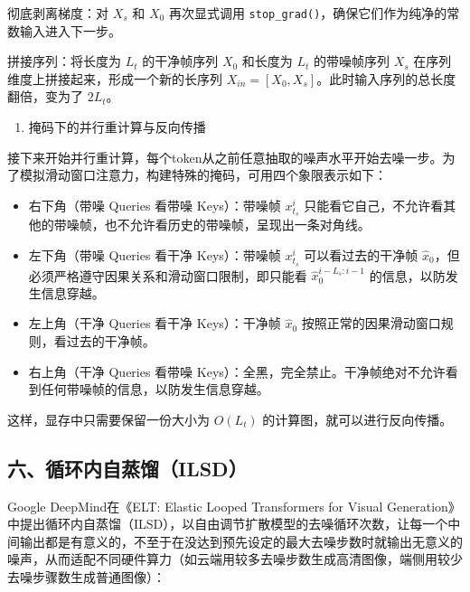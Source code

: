 彻底剥离梯度：对 \(X_s\) 和 \(X_0\) 再次显式调用 \texttt{stop\_grad()}，确保它们作为纯净的常数输入进入下一步。

拼接序列：将长度为 \(L_t\) 的干净帧序列 \(X_0\) 和长度为 \(L_t\) 的带噪帧序列 \(X_s\) 在序列维度上拼接起来，形成一个新的长序列 \(X_{in}=[X_0,X_s]\)。此时输入序列的总长度翻倍，变为了 \(2L_t\)。

\begin{enumerate}
\def\labelenumi{\arabic{enumi}.}
\setcounter{enumi}{2}
\tightlist
\item
  掩码下的并行重计算与反向传播
\end{enumerate}

接下来开始并行重计算，每个token从之前任意抽取的噪声水平开始去噪一步。为了模拟滑动窗口注意力，构建特殊的掩码，可用四个象限表示如下：

\begin{itemize}
\tightlist
\item
  右下角（带噪 Queries 看带噪 Keys）：带噪帧 \(x_{t_s}^i\) 只能看它自己，不允许看其他的带噪帧，也不允许看历史的带噪帧，呈现出一条对角线。
\item
  左下角（带噪 Queries 看干净 Keys）：带噪帧 \(x_{t_s}^i\) 可以看过去的干净帧 \(\hat{x}_0\)，但必须严格遵守因果关系和滑动窗口限制，即只能看 \(\hat{x}_0^{i-L_s:i-1}\) 的信息，以防发生信息穿越。
\item
  左上角（干净 Queries 看干净 Keys）：干净帧 \(\hat{x}_0\) 按照正常的因果滑动窗口规则，看过去的干净帧。
\item
  右上角（干净 Queries 看带噪 Keys）：全黑，完全禁止。干净帧绝对不允许看到任何带噪帧的信息，以防发生信息穿越。
\end{itemize}

这样，显存中只需要保留一份大小为 \(O(L_t)\) 的计算图，就可以进行反向传播。

\hypertarget{ux516dux5faaux73afux5185ux81eaux84b8ux998filsd}{%
\subsection{六、循环内自蒸馏（ILSD）}\label{ux516dux5faaux73afux5185ux81eaux84b8ux998filsd}}

Google DeepMind在《ELT: Elastic Looped Transformers for Visual Generation》中提出循环内自蒸馏（ILSD），以自由调节扩散模型的去噪循环次数，让每一个中间输出都是有意义的，不至于在没达到预先设定的最大去噪步数时就输出无意义的噪声，从而适配不同硬件算力（如云端用较多去噪步数生成高清图像，端侧用较少去噪步骤数生成普通图像）：

